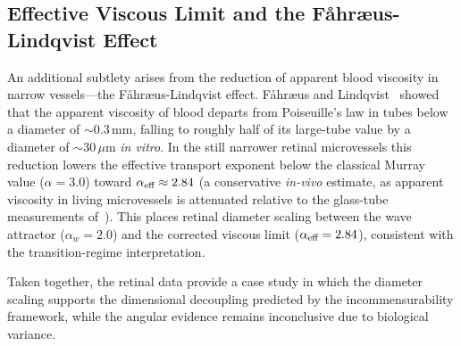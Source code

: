 \subsection{Effective Viscous Limit and the Fåhræus-Lindqvist Effect}

An additional subtlety arises from the reduction of apparent blood viscosity in
narrow vessels---the Fåhræus-Lindqvist effect. Fåhræus and
Lindqvist~\cite{fahraeuslindqvist1931} showed that the apparent viscosity of
blood departs from Poiseuille's law in tubes below a diameter of $\sim 0.3$\,mm,
falling to roughly half of its large-tube value by a diameter of $\sim 30\,\mu$m
\emph{in vitro}. In the still narrower retinal microvessels this reduction
lowers the effective transport exponent below the classical Murray value
($\alpha = 3.0$) toward $\alpha_{\text{eff}} \approx 2.84$
(a conservative \emph{in-vivo} estimate, as apparent viscosity in living
microvessels is attenuated relative to the glass-tube measurements
of~\cite{fahraeuslindqvist1931}). This places retinal diameter scaling between
the wave attractor ($\alpha_w = 2.0$) and the corrected viscous limit
($\alpha_{\text{eff}} = 2.84$), consistent with the
transition-regime interpretation.

Taken together, the retinal data provide a case study in which the diameter
scaling supports the dimensional decoupling predicted by the
incommensurability framework, while the angular evidence remains inconclusive
due to biological variance.

